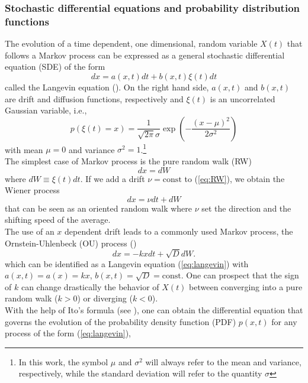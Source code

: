 \subsubsection{Stochastic differential equations and probability distribution functions}
The evolution of a time dependent, one dimensional, random variable $X(t)$ that follows a Markov process can be expressed as a general stochastic differential equation (SDE) of the form
\begin{equation}
	dx = a(x,t)dt + b(x,t)\xi(t)dt
	\label{eq:langevin}
\end{equation}
called the Langevin equation (\citet[Eq. 4.1.1]{Gardiner1996}). 
On the right hand side, $a(x,t)$ and $b(x,t)$ are drift and diffusion functions, respectively and $\xi(t)$ is an uncorrelated Gaussian variable, i.e.,
\[
p(\xi(t)=x)=\frac{1}{\sqrt{2\pi}\sigma}\exp(-\frac{(x-\mu)^2}{2\sigma^2})
\]
with mean $\mu=0$ and variance $\sigma^2=1$.\footnote{In this work, the symbol $\mu$ and $\sigma^2$ will always refer to the mean and variance, respectively, while the standard deviation will refer to the quantity $\sigma$}\\
The simplest case of Markov process is the pure random walk (RW)
\begin{equation}\label{eq:RW}
	dx = dW
\end{equation}
where $dW\equiv\xi(t)dt$.
If we add a drift $\nu=\mathrm{const}$ to (\ref{eq:RW}), we obtain the Wiener process
\begin{equation}\label{eq:wiener}
dx = \nu dt + dW
\end{equation}
that can be seen as an oriented random walk where $\nu$ set the direction and the shifting speed of the average.\\
The use of an $x$ dependent drift leads to a commonly used Markov process, the Ornstein-Uhlenbeck (OU) process (\citet[Sec. 3.8.4]{Gardiner1996})
\begin{equation}
dx = -kxdt + \sqrt{D}dW.
\label{eq:OU}
\end{equation}
which can be identified as a Langevin equation (\ref{eq:langevin}) with $a(x,t)=a(x)=kx$, $b(x,t)=\sqrt{D}=\mathrm{const}$. 
One can prospect that the sign of $k$ can change drastically the behavior of $X(t)$ between converging into a pure random walk ($k>0$) or diverging ($k<0$).\\
With the help of Ito's formula (see \citet[Sec. 4.3.4]{Gardiner1996}), one can obtain the differential equation that governs the evolution of the probability density function (PDF) $p(x,t)$ for any process of the form (\ref{eq:langevin}),

